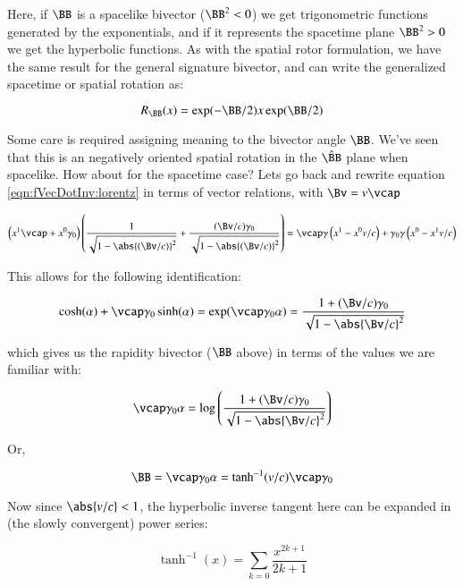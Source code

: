 Here, if $\BB$ is a spacelike bivector ($\BB^2 < 0$) we get trigonometric functions generated by the exponentials, and if it represents
the spacetime plane $\BB^2 > 0$ we get the hyperbolic functions.  As with the spatial rotor formulation, we have the same result for the
general signature bivector, and can write the generalized spacetime or spatial rotation as:

\begin{equation}
R_{\BB}(x) = \exp(-\BB/2) x \exp(\BB/2)
\end{equation}

Some care is required assigning meaning to the bivector angle $\BB$.  We've seen that this is an negatively oriented spatial rotation in the $
\Bcap$ plane when spacelike.  How about for the spacetime case?
Lets go back and rewrite equation \ref{eqn:fVecDotInv:lorentz} in terms of vector
relations, with $\Bv = v \vcap$

\begin{equation}
\left( x^1 \vcap + x^0 \gamma_0 \right) 
\left(
\frac{1}{\sqrt{1 -{\abs{(\Bv/c)}}^2}} + \frac{(\Bv/c) \gamma_0}{\sqrt{1 -{\abs{(\Bv/c)}}^2}}
\right)
=
\vcap \gamma 
\left( x^1 - x^0 v/c \right)
+
\gamma_0 \gamma
\left( x^0 - x^1 v/c \right)
\end{equation}

This allows for the following identification:

\begin{equation*}
\cosh(\alpha) + \vcap \gamma_0 \sinh(\alpha) = \exp( \vcap \gamma_0 \alpha)
=
\frac{1 + (\Bv/c) \gamma_0}{\sqrt{1 -{\abs{\Bv/c}}^2}}
\end{equation*}

which gives us the rapidity bivector ($\BB$ above) in terms of the values we are familiar with:

\begin{equation*}
\vcap \gamma_0 \alpha = \log\left( 
\frac{1 + (\Bv/c) \gamma_0}{\sqrt{1 -{\abs{\Bv/c}}^2}} \right)
\end{equation*}

Or,

\begin{equation*}
\BB = \vcap \gamma_0 \alpha = \tanh^{-1}(v/c) \vcap \gamma_0
\end{equation*}

Now since $\abs{v/c} < 1$, the hyperbolic inverse tangent here can be expanded in (the slowly convergent) power series:

\begin{equation*}
\tanh^{-1}(x) = \sum_{k=0} \frac{x^{2k+1}}{2k+1}
\end{equation*}

